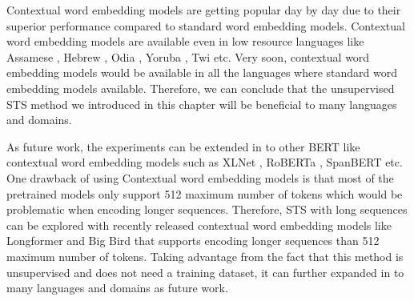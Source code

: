 Contextual word embedding models are getting popular day by day due to their superior performance compared to standard word embedding models. Contextual word embedding models are available even in low resource languages like Assamese \cite{kakwani-etal-2020-indicnlpsuite}, Hebrew \cite{chriqui2021hebert}, Odia \cite{kakwani-etal-2020-indicnlpsuite}, Yoruba \cite{alabi-etal-2020-massive}, Twi \cite{alabi-etal-2020-massive} etc. Very soon, contextual word embedding models would be available in all the languages where  standard word embedding models available. Therefore, we can conclude that the unsupervised STS method we introduced in this chapter will be beneficial to many languages and domains. 

As future work, the experiments can be extended in to other BERT like contextual word embedding models such as XLNet \cite{yang2019xlnet}, RoBERTa \cite{liu2019roberta}, SpanBERT \cite{joshi-etal-2020-spanbert} etc. One drawback of using Contextual word embedding models is that most of the pretrained models only support 512 maximum number of tokens which would be problematic when encoding longer sequences. Therefore, STS with long sequences can be explored with recently released contextual word embedding models like Longformer \cite{beltagy2020}  and Big Bird \cite{zaheer2021} that supports encoding longer sequences than 512 maximum number of tokens. Taking advantage from the fact that this method is unsupervised and does not need a training dataset, it can further expanded in to many languages and domains as future work.   

